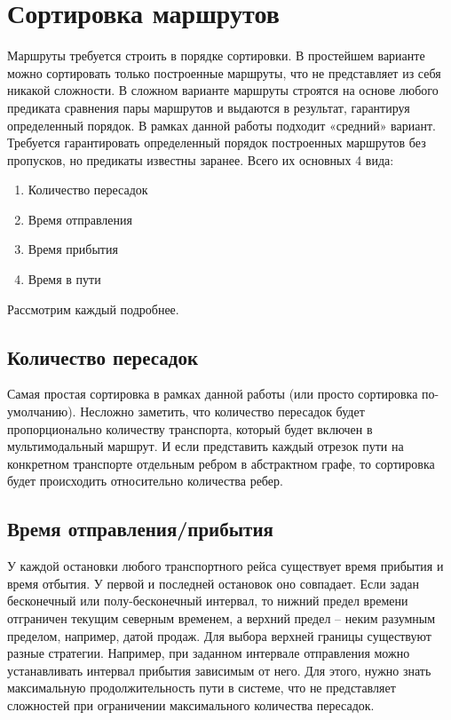 \section{Сортировка маршрутов}
Маршруты требуется строить в порядке сортировки. В простейшем варианте можно сортировать только построенные маршруты, что не представляет из себя никакой сложности. В сложном варианте маршруты строятся на основе любого предиката сравнения пары маршрутов и выдаются в результат, гарантируя определенный порядок. В рамках данной работы подходит «средний» вариант. Требуется гарантировать определенный порядок построенных маршрутов без пропусков, но предикаты известны заранее. Всего их основных 4 вида:
\begin{enumerate}
    \item Количество пересадок
    \item Время отправления
    \item Время прибытия
    \item Время в пути
\end{enumerate}

Рассмотрим каждый подробнее.

\subsection{Количество пересадок}
Самая простая сортировка в рамках данной работы (или просто сортировка по-умолчанию). Несложно заметить, что количество пересадок будет пропорционально количеству транспорта, который будет включен в мультимодальный маршрут. И если представить каждый отрезок пути на конкретном транспорте отдельным ребром в абстрактном графе, то сортировка будет происходить относительно количества ребер.

\subsection{Время отправления/прибытия}
У каждой остановки любого транспортного рейса существует время прибытия и время отбытия. У первой и последней остановок оно совпадает. Если задан бесконечный или полу-бесконечный интервал, то нижний предел времени отграничен текущим северным временем, а верхний предел -- неким разумным пределом, например, датой продаж. Для выбора верхней границы существуют разные стратегии. Например, при заданном интервале отправления можно устанавливать интервал прибытия зависимым от него. Для этого, нужно знать максимальную продолжительность пути в системе, что не представляет сложностей при ограничении максимального количества пересадок.

